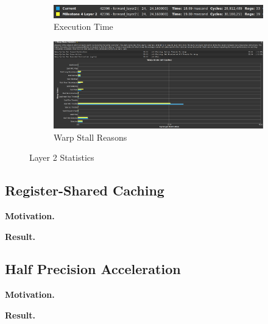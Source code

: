 \documentclass{article}
\begin{document}
\begin{figure}[H]
    \centering
    \begin{subfigure}[b]{\linewidth}
        \includegraphics[width=\linewidth]{pragma_layer2_summary}
        \caption{Execution Time}
    \end{subfigure}
    \begin{subfigure}[b]{\linewidth}
        \includegraphics[width=\linewidth]{pragma_layer2_warp}
        \caption{Warp Stall Reasons}
    \end{subfigure}
    \caption{Layer 2 Statistics}
\end{figure}

\subsection{Register-Shared Caching}
\textbf{Motivation.}

\textbf{Result.}

\subsection{Half Precision Acceleration}
\textbf{Motivation.}

\textbf{Result.}
\end{document}
